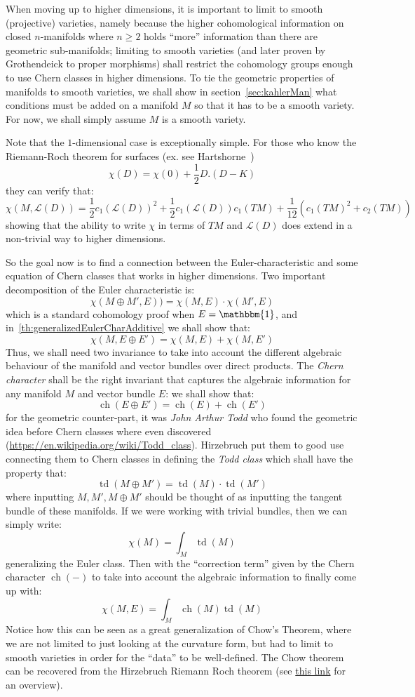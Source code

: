 \documentclass{book}
\newcommand{\CL}{{\mathcal{L}}}
\newcommand{\ch}{{\operatorname{ch}}}
\newcommand{\td}{{\operatorname{td}}}
\renewcommand{\ch}{{\operatorname{ch}}}
\begin{document}
When moving up to higher dimensions, it is important to limit to smooth (projective) varieties, namely because the higher
cohomological information on closed $n$-manifolds where $n\ge 2$ holds ``more'' information than there are
geometric sub-manifolds; limiting to smooth varieties (and later proven by Grothendeick to proper
morphisms) shall restrict the cohomology groups enough to use Chern classes in higher dimensions. To tie the
geometric properties of manifolds to smooth varieties, we shall show in section~\ref{sec:kahlerMan} what
conditions must be added on a manifold $M$ so that it has to be a smooth variety. For now, we shall simply
assume $M$ is a smooth variety.

Note that the $1$-dimensional case is exceptionally simple. For those who know the Riemann-Roch theorem for
surfaces (ex. see Hartshorne~\cite[chapter~5.1, theorem~1.6]{hartshorneAlgebraicGeometry2013})
\[
\chi(D) = \chi(0) + \frac{1}{2}D.(D-K)
\]
they can verify that:
\[
  \chi(M, \CL(D)) =\frac{1}{2}c_1(\CL(D))^2 + \frac{1}{2}c_1(\CL(D))c_1(TM) + \frac{1}{12}(c_1(TM)^2 + c_2(TM))
\]
showing that the ability to write $\chi$ in terms of $TM$ and $\CL(D)$ does extend in a non-trivial way to higher
dimensions.

So the goal now is to find a connection between the Euler-characteristic and some equation of Chern classes
that works in higher dimensions. Two important decomposition of the Euler characteristic is:
\[
  \chi(M\oplus M', E)) = \chi(M, E)\cdot \chi(M', E)
\]
which is a standard cohomology proof when $E = \mathbbm{1}$, and in~\cref{th:generalizedEulerCharAdditive} we shall show that:
\[
  \chi(M, E\oplus E') = \chi(M, E) + \chi(M, E')
\]
Thus, we shall need two invariance to take into account the different algebraic behaviour of the manifold and
vector bundles over direct products. The \emph{Chern character} shall be the right invariant that captures the
algebraic information for any manifold $M$ and vector bundle $E$: we shall show that:
\[
  \ch(E\oplus E') = \ch(E) + \ch(E')
\]
for the geometric counter-part, it was \emph{John Arthur Todd} who found
the geometric idea before Chern classes where even discovered
(\url{https://en.wikipedia.org/wiki/Todd_class}). Hirzebruch put them to good use connecting
them to Chern classes in defining the \emph{Todd class} which shall have the property that:
\[
  \td(M\oplus M') = \td(M)\cdot \td(M')
\]
where inputting $M, M', M\oplus M'$ should be thought of as inputting the tangent bundle of these manifolds.
If we were working with trivial bundles, then we can simply write:
\[
  \chi(M) = \int_M \td(M)
\]
generalizing the Euler class. Then with the ``correction term'' given by the Chern character $\ch(-)$ to take
into account the algebraic information to finally come up with:
\[
  \chi(M,E) = \int_M \ch(M)\td(M)
\]
Notice how this can be seen as a great generalization of Chow's Theorem, where we are not limited to just
looking at the curvature form, but had to limit to smooth varieties in order for the ``data'' to be
well-defined. The Chow theorem can be recovered
from the Hirzebruch Riemann Roch theorem (see \href{https://mathoverflow.net/questions/73450/top-chern-class-euler-characteristic}{this link} for an
overview).
\end{document}
